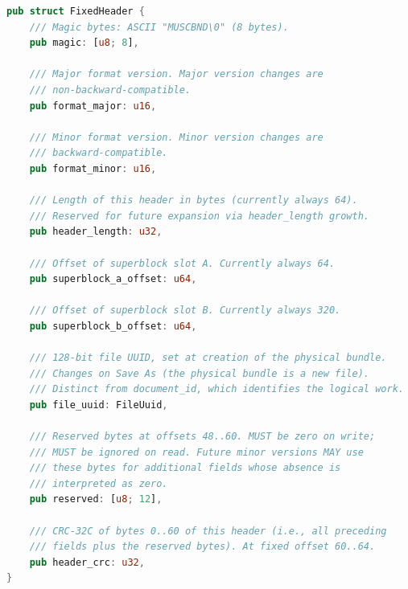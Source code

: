\documentclass[11pt,letterpaper]{report}
\begin{document}
\begin{lstlisting}[language=Rust]
pub struct FixedHeader {
    /// Magic bytes: ASCII "MUSCBND\0" (8 bytes).
    pub magic: [u8; 8],

    /// Major format version. Major version changes are
    /// non-backward-compatible.
    pub format_major: u16,

    /// Minor format version. Minor version changes are
    /// backward-compatible.
    pub format_minor: u16,

    /// Length of this header in bytes (currently always 64).
    /// Reserved for future expansion via header_length growth.
    pub header_length: u32,

    /// Offset of superblock slot A. Currently always 64.
    pub superblock_a_offset: u64,

    /// Offset of superblock slot B. Currently always 320.
    pub superblock_b_offset: u64,

    /// 128-bit file UUID, set at creation of the physical bundle.
    /// Changes on Save As (the physical bundle is a new file).
    /// Distinct from document_id, which identifies the logical work.
    pub file_uuid: FileUuid,

    /// Reserved bytes at offsets 48..60. MUST be zero on write;
    /// MUST be ignored on read. Future minor versions MAY use
    /// these bytes for additional fields whose absence is
    /// interpreted as zero.
    pub reserved: [u8; 12],

    /// CRC-32C of bytes 0..60 of this header (i.e., all preceding
    /// fields plus the reserved bytes). At fixed offset 60..64.
    pub header_crc: u32,
}
\end{lstlisting}
\end{document}
